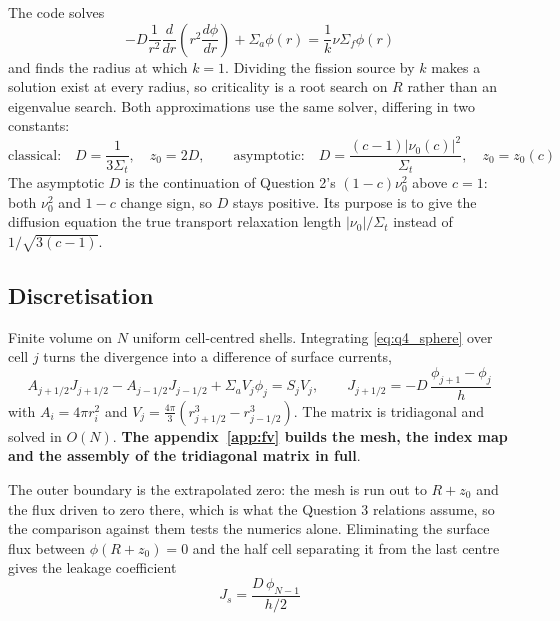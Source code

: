 \documentclass[11pt]{article}
\begin{document}
The code solves
\begin{equation}
    -D \frac{1}{r^2} \frac{d}{dr}\left( r^2 \frac{d\phi}{dr} \right) + \Sigma_a \phi(r) = \frac{1}{k} \nu \Sigma_f \phi(r)
    \label{eq:q4_sphere}
\end{equation}
and finds the radius at which $k = 1$. Dividing the fission source by $k$ makes a solution exist at every radius, so criticality is a root search on $R$ rather than an eigenvalue search. Both approximations use the same solver, differing in two constants:
\begin{equation}
    \text{classical:} \quad D = \frac{1}{3\Sigma_t}, \quad z_0 = 2D,
    \qquad
    \text{asymptotic:} \quad D = \frac{(c-1)|\nu_0(c)|^2}{\Sigma_t}, \quad z_0 = z_0(c)
\end{equation}
The asymptotic $D$ is the continuation of Question 2's $(1-c)\nu_0^2$ above $c = 1$: both $\nu_0^2$ and $1-c$ change sign, so $D$ stays positive. Its purpose is to give the diffusion equation the true transport relaxation length $|\nu_0|/\Sigma_t$ instead of $1/\sqrt{3(c-1)}$.

\subsection*{Discretisation}

Finite volume on $N$ uniform cell-centred shells. Integrating \eqref{eq:q4_sphere} over cell $j$ turns the divergence into a difference of surface currents,
\begin{equation}
    A_{j+1/2} J_{j+1/2} - A_{j-1/2} J_{j-1/2} + \Sigma_a V_j \phi_j = S_j V_j,
    \qquad J_{j+1/2} = -D\,\frac{\phi_{j+1} - \phi_j}{h}
    \label{eq:q4_fv}
\end{equation}
with $A_i = 4\pi r_i^2$ and $V_j = \frac{4\pi}{3}(r_{j+1/2}^3 - r_{j-1/2}^3)$. The matrix is tridiagonal and solved in $O(N)$. \textbf{The appendix~\ref{app:fv} builds the mesh, the index map and the assembly of the tridiagonal matrix in full}.

The outer boundary is the extrapolated zero: the mesh is run out to $R + z_0$ and the flux driven to zero there, which is what the Question 3 relations assume, so the comparison against them tests the numerics alone. Eliminating the surface flux between $\phi(R + z_0) = 0$ and the half cell separating it from the last centre gives the leakage coefficient
\begin{equation}
    J_s = \frac{D\,\phi_{N-1}}{h/2}
\end{equation}
\end{document}
